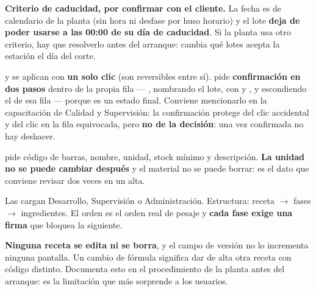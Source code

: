 \begin{cajaNota}
\textbf{Criterio de caducidad, por confirmar con el cliente.} La fecha es de calendario
de la planta (sin hora ni desfase por huso horario) y el lote \textbf{deja de poder
usarse a las 00:00 de su día de caducidad}. Si la planta usa otro criterio, hay que
resolverlo antes del arranque: cambia qué lotes acepta la estación el día del corte.
\end{cajaNota}


\begin{cajaNota}
 y  se aplican con \textbf{un solo clic} (son reversibles
entre sí).  pide \textbf{confirmación en dos pasos} dentro de la propia
fila --- , nombrando el lote, con  y
, y escondiendo el  de esa fila --- porque \rechazado{}
es un estado final. Conviene mencionarlo en la capacitación de Calidad y Supervisión:
la confirmación protege del clic accidental y del clic en la fila equivocada, pero
\textbf{no de la decisión}: una vez confirmada no hay deshacer.
\end{cajaNota}


 pide código de barras, nombre, unidad, stock mínimo y
descripción. \textbf{La unidad no se puede cambiar después} y el material no se puede
borrar: es el dato que conviene revisar dos veces en un alta.


\newpage
{}


Las cargan Desarrollo, Supervisión o Administración. Estructura: receta
$\rightarrow$ fases $\rightarrow$ ingredientes. El orden es el orden real de pesaje y
\textbf{cada fase exige una firma} que bloquea la siguiente.

\begin{cajaOjo}
\textbf{Ninguna receta se edita ni se borra}, y el campo de versión no lo incrementa
ninguna pantalla. Un cambio de fórmula significa dar de alta otra receta con código
distinto. Documenta esto en el procedimiento de la planta antes del arranque: es la
limitación que más sorprende a los usuarios.
\end{cajaOjo}

